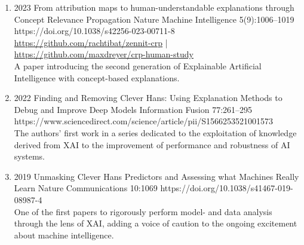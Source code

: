         \begin{enumerate}
            \item
                            {2023}
                            {From attribution maps to human-understandable explanations through Concept Relevance Propagation}
                            {Nature Machine Intelligence}
                            {5(9):1006--1019}
                            {https://doi.org/10.1038/s42256-023-00711-8}
                            {   \\
                                \href{https://github.com/rachtibat/zennit-crp}{https://github.com/rachtibat/zennit-crp} |
                                \href{https://github.com/maxdreyer/crp-human-study}{https://github.com/maxdreyer/crp-human-study}\\
                                A paper introducing the second generation of Explainable Artificial Intelligence with concept-based explanations.
                            }


            \item
                            {2022}
                            {Finding and Removing Clever Hans: Using Explanation Methods to Debug and Improve Deep Models}
                            {Information Fusion}
                            {77:261--295}
                            {https://www.sciencedirect.com/science/article/pii/S1566253521001573}
                            {\\
                            The authors' first work in a series dedicated to the exploitation of knowledge derived from XAI to the improvement of performance and robustness of AI systems.}


            \item
                            {2019}
                            {Unmasking Clever Hans Predictors and Assessing what Machines Really Learn}
                            {Nature Communications}
                            {10:1069}
                            {https://doi.org/10.1038/s41467-019-08987-4}
                            {\\
                            One of the first papers to rigorously
                            perform model- and data analysis through the lens of XAI, adding a voice of caution to the ongoing excitement about machine intelligence.}



\end{enumerate}
